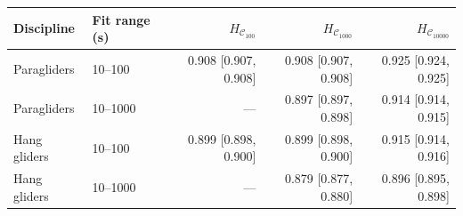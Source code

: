 \begin{tabular}{llrrr}
\toprule
Discipline & Fit range (s) & $H_{\mathcal C_{100}}$ & $H_{\mathcal C_{1000}}$ & $H_{\mathcal C_{10000}}$\\
\midrule
Paragliders & 10--100 & 0.908 [0.907, 0.908] & 0.908 [0.907, 0.908] & 0.925 [0.924, 0.925]\\
Paragliders & 10--1000 & --- & 0.897 [0.897, 0.898] & 0.914 [0.914, 0.915]\\
Hang gliders & 10--100 & 0.899 [0.898, 0.900] & 0.899 [0.898, 0.900] & 0.915 [0.914, 0.916]\\
Hang gliders & 10--1000 & --- & 0.879 [0.877, 0.880] & 0.896 [0.895, 0.898]\\
\bottomrule
\end{tabular}
